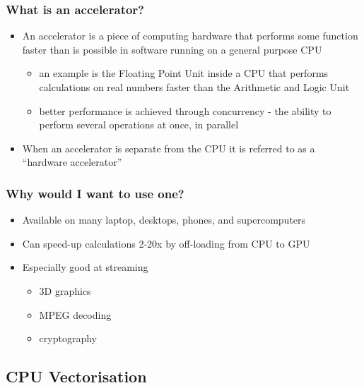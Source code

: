 \subsubsection{What is an accelerator?}\label{what-is-an-accelerator}

\begin{itemize}
\itemsep1pt\parskip0pt
\item
  An accelerator is a piece of computing hardware that performs some
  function faster than is possible in software running on a general
  purpose CPU

  \begin{itemize}
  \itemsep1pt\parskip0pt
  \item
    an example is the Floating Point Unit inside a CPU that performs
    calculations on real numbers faster than the Arithmetic and Logic
    Unit
  \item
    better performance is achieved through concurrency - the ability to
    perform several operations at once, in parallel
  \end{itemize}
\item
  When an accelerator is separate from the CPU it is referred to as a
  ``hardware accelerator''
\end{itemize}

\subsubsection{Why would I want to use
one?}\label{why-would-i-want-to-use-one}

\begin{itemize}
\itemsep1pt\parskip0pt
\item
  Available on many laptop, desktops, phones, and supercomputers
\item
  Can speed-up calculations 2-20x by off-loading from CPU to GPU
\item
  Especially good at streaming

  \begin{itemize}
  \itemsep1pt\parskip0pt
  \item
    3D graphics
  \item
    MPEG decoding
  \item
    cryptography
  \end{itemize}
\end{itemize}

\subsection{CPU Vectorisation}\label{cpu-vectorisation}

